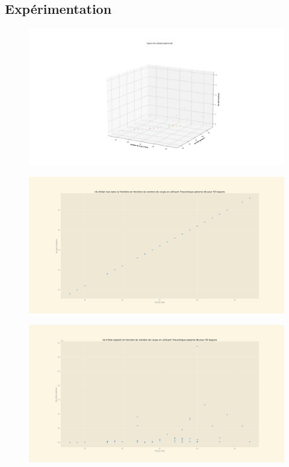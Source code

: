 \documentclass[a4paper, 12pt]{article}
\begin{document}
\subsection{Expérimentation}

\begin{figure}[H]
    \centering
    \includegraphics[width=\textwidth]{Taquin 4x4 pa_db graphe 3d}
\end{figure}
\begin{figure}[H]
    \centering
    \includegraphics[width=\textwidth]{Taquin 4x4 pa_db nb de etat dans la frontiere en fonction du nb de coups}
\end{figure}
\begin{figure}[H]
    \centering
    \includegraphics[width=\textwidth]{Taquin 4x4 pa_db nb de noeud exploere en fonction du nombre de coups}
\end{figure}
\end{document}
